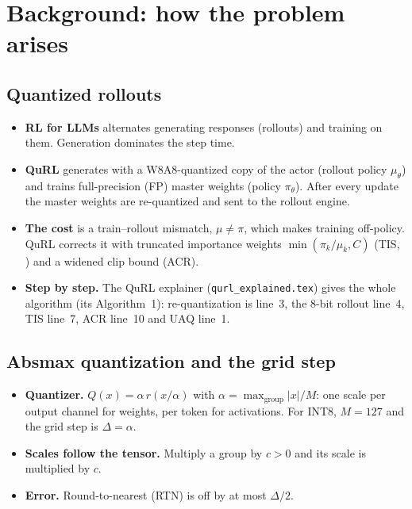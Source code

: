 \documentclass[11pt]{article}
\begin{document}
\tableofcontents

\section{Background: how the problem arises}\label{sec:background}

\subsection{Quantized rollouts}
\begin{itemize}
\item \textbf{RL for LLMs} alternates generating responses (rollouts) and training on them. Generation dominates the step time.
\item \textbf{QuRL} generates with a W8A8-quantized copy of the actor (rollout policy $\mu_\theta$) and trains full-precision (FP) master weights (policy $\pi_\theta$). After every update the master weights are re-quantized and sent to the rollout engine.
\item \textbf{The cost} is a train--rollout mismatch, $\mu\neq\pi$, which makes training off-policy. QuRL corrects it with truncated importance weights $\min(\pi_k/\mu_k,C)$ (TIS, \citealp{yao2025flashrl}) and a widened clip bound (ACR).
\item \textbf{Step by step.} The QuRL explainer (\texttt{qurl\_explained.tex}) gives the whole algorithm (its Algorithm~1): re-quantization is line~3, the 8-bit rollout line~4, TIS line~7, ACR line~10 and UAQ line~1.
\end{itemize}

\subsection{Absmax quantization and the grid step}
\begin{itemize}
\item \textbf{Quantizer.} $Q(x)=\alpha\,r(x/\alpha)$ with $\alpha=\max_{\text{group}}|x|/M$: one scale per output channel for weights, per token for activations. For INT8, $M=127$ and the grid step is $\Delta=\alpha$.
\item \textbf{Scales follow the tensor.} Multiply a group by $c>0$ and its scale is multiplied by $c$.
\item \textbf{Error.} Round-to-nearest (RTN) is off by at most $\Delta/2$.
\end{itemize}
\end{document}
